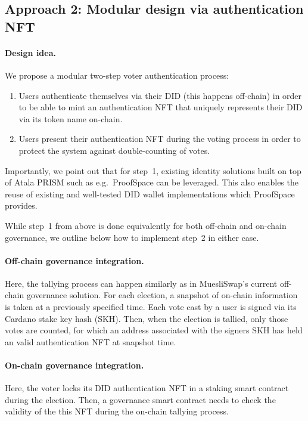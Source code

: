 \documentclass[11pt]{article}
\begin{document}
\subsection{Approach 2: Modular design via authentication NFT}

\paragraph{Design idea.} We propose a modular two-step voter authentication process:
\begin{enumerate}
\item Users authenticate themselves via their DID (this happens off-chain) in order to be able to mint an authentication NFT that uniquely represents their DID via its token name on-chain.
\item Users present their authentication NFT during the voting process in order to protect the system against double-counting of votes.
\end{enumerate}
Importantly, we point out that for step~1, existing identity solutions built on top of Atala PRISM such as e.g.\ ProofSpace can be leveraged. This also enables the reuse of existing and well-tested DID wallet implementations which ProofSpace provides. 

While step~1 from above is done equivalently for both off-chain and on-chain governance, we outline below how to implement step~2 in either case.

\paragraph{Off-chain governance integration.} Here, the tallying process can happen similarly as in MuesliSwap's current off-chain governance solution. For each election, a snapshot of on-chain information is taken at a previously specified time. Each vote cast by a user is signed via its Cardano stake key hash (SKH). Then, when the election is tallied, only those votes are counted, for which an address associated with the signers SKH has held an valid authentication NFT at snapshot time.

\paragraph{On-chain governance integration.} Here, the voter locks its DID authentication NFT in a staking smart contract during the election. Then, a governance smart contract needs to check the validity of the this NFT during the on-chain tallying process.
\end{document}
